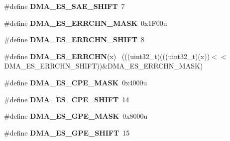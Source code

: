 \begin{DoxyCompactItemize}
\item 
\hypertarget{group___d_m_a___register___masks_gab8fcc55b025406188612ca7ea6fd4eb7}{}\#define {\bfseries D\+M\+A\+\_\+\+E\+S\+\_\+\+S\+A\+E\+\_\+\+S\+H\+I\+F\+T}~7\label{group___d_m_a___register___masks_gab8fcc55b025406188612ca7ea6fd4eb7}

\item 
\hypertarget{group___d_m_a___register___masks_ga1706839a3ec91f2cd194526d1d5fc60e}{}\#define {\bfseries D\+M\+A\+\_\+\+E\+S\+\_\+\+E\+R\+R\+C\+H\+N\+\_\+\+M\+A\+S\+K}~0x1\+F00u\label{group___d_m_a___register___masks_ga1706839a3ec91f2cd194526d1d5fc60e}

\item 
\hypertarget{group___d_m_a___register___masks_ga67f75f97e4bc971fa4044115d2831ede}{}\#define {\bfseries D\+M\+A\+\_\+\+E\+S\+\_\+\+E\+R\+R\+C\+H\+N\+\_\+\+S\+H\+I\+F\+T}~8\label{group___d_m_a___register___masks_ga67f75f97e4bc971fa4044115d2831ede}

\item 
\hypertarget{group___d_m_a___register___masks_ga25ba21430fbd8d0737dcf574bfd6e4d4}{}\#define {\bfseries D\+M\+A\+\_\+\+E\+S\+\_\+\+E\+R\+R\+C\+H\+N}(x)                                              ~(((uint32\+\_\+t)(((uint32\+\_\+t)(x))$<$$<$D\+M\+A\+\_\+\+E\+S\+\_\+\+E\+R\+R\+C\+H\+N\+\_\+\+S\+H\+I\+F\+T))\&D\+M\+A\+\_\+\+E\+S\+\_\+\+E\+R\+R\+C\+H\+N\+\_\+\+M\+A\+S\+K)\label{group___d_m_a___register___masks_ga25ba21430fbd8d0737dcf574bfd6e4d4}

\item 
\hypertarget{group___d_m_a___register___masks_ga49f6b77458101e61786c204ff60998cb}{}\#define {\bfseries D\+M\+A\+\_\+\+E\+S\+\_\+\+C\+P\+E\+\_\+\+M\+A\+S\+K}~0x4000u\label{group___d_m_a___register___masks_ga49f6b77458101e61786c204ff60998cb}

\item 
\hypertarget{group___d_m_a___register___masks_ga58313d5021ff6e2f0c8a55652c10316b}{}\#define {\bfseries D\+M\+A\+\_\+\+E\+S\+\_\+\+C\+P\+E\+\_\+\+S\+H\+I\+F\+T}~14\label{group___d_m_a___register___masks_ga58313d5021ff6e2f0c8a55652c10316b}

\item 
\hypertarget{group___d_m_a___register___masks_ga6a09e026c090189024afa6ac57a241aa}{}\#define {\bfseries D\+M\+A\+\_\+\+E\+S\+\_\+\+G\+P\+E\+\_\+\+M\+A\+S\+K}~0x8000u\label{group___d_m_a___register___masks_ga6a09e026c090189024afa6ac57a241aa}

\item 
\hypertarget{group___d_m_a___register___masks_ga21e0899cfe26444ad82228135256336f}{}\#define {\bfseries D\+M\+A\+\_\+\+E\+S\+\_\+\+G\+P\+E\+\_\+\+S\+H\+I\+F\+T}~15\label{group___d_m_a___register___masks_ga21e0899cfe26444ad82228135256336f}


\end{DoxyCompactItemize}

